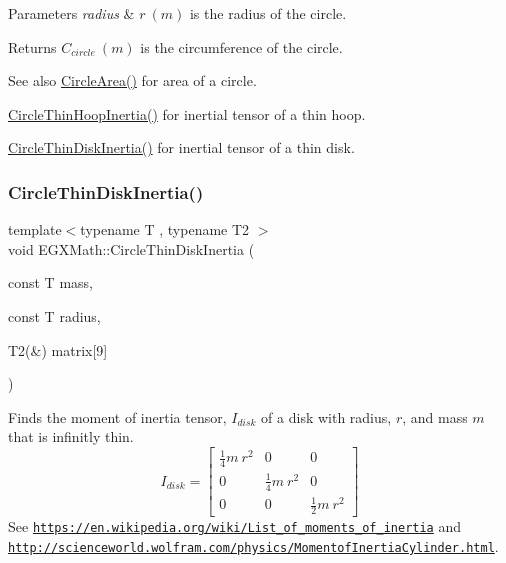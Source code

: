 \begin{DoxyParams}{Parameters}
{\em radius} & $ r\ (m)$ is the radius of the circle. \\
\hline
\end{DoxyParams}
\begin{DoxyReturn}{Returns}
$ C_{circle}\ (m)$ is the circumference of the circle. 
\end{DoxyReturn}
\begin{DoxySeeAlso}{See also}
\mbox{\hyperlink{group___e_g_x_math-_geometry-2_d-_circle_gabf5aadec991cc2bbf9d74fd83c46f40d}{Circle\+Area()}} for area of a circle. 

\mbox{\hyperlink{group___e_g_x_math-_geometry-2_d-_circle_ga5c84d0d64d475e472a75f4f10b4a0c26}{Circle\+Thin\+Hoop\+Inertia()}} for inertial tensor of a thin hoop. 

\mbox{\hyperlink{group___e_g_x_math-_geometry-2_d-_circle_ga2ccb30846977757242697e70983bbec5}{Circle\+Thin\+Disk\+Inertia()}} for inertial tensor of a thin disk. 
\end{DoxySeeAlso}
\mbox{\label{group___e_g_x_math-_geometry-2_d-_circle_ga4d5e95f0986ab5e760679adeccb53181}} 
\subsubsection{\texorpdfstring{Circle\+Thin\+Disk\+Inertia()}{CircleThinDiskInertia()}\hspace{0.1cm}{\footnotesize\ttfamily [1/3]}}
{\footnotesize\ttfamily template$<$typename T , typename T2 $>$ \\
void E\+G\+X\+Math\+::\+Circle\+Thin\+Disk\+Inertia (\begin{DoxyParamCaption}\item[{const T}]{mass,  }\item[{const T}]{radius,  }\item[{T2(\&)}]{matrix\mbox{[}9\mbox{]} }\end{DoxyParamCaption})}



Finds the moment of inertia tensor, $I_{disk}$ of a disk with radius, $r$, and mass $m$ that is infinitly thin. \[ I_{disk}=\begin{bmatrix} \frac{1}{4}m\ r^2 & 0 & 0\\ 0 & \frac{1}{4}m\ r^2 & 0\\ 0 & 0 & \frac{1}{2}m\ r^2 \end{bmatrix} \] See \href{https://en.wikipedia.org/wiki/List_of_moments_of_inertia}{\tt https\+://en.\+wikipedia.\+org/wiki/\+List\+\_\+of\+\_\+moments\+\_\+of\+\_\+inertia} and \href{http://scienceworld.wolfram.com/physics/MomentofInertiaCylinder.html}{\tt http\+://scienceworld.\+wolfram.\+com/physics/\+Momentof\+Inertia\+Cylinder.\+html}. 


